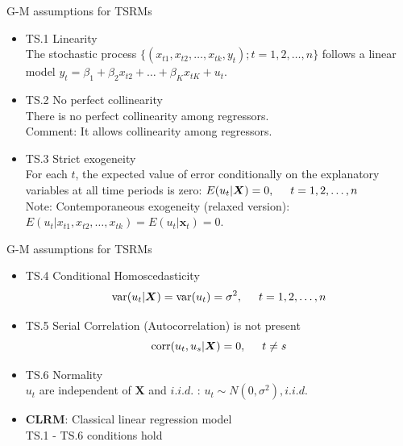 \documentclass{beamer}
\begin{document}
\begin{frame}{G-M assumptions for TSRMs}
\begin{itemize}
\item TS.1 Linearity \\ 
The stochastic process $\{(x_{t1},x_{t2},\dots,x_{tk},y_t);t=1,2,\dots, n \}$ 
follows a linear model $ y_t = \beta_1 + \beta_2 x_{t2} + \dots + \beta_K x_{tK}+u_t$.
\medskip
\item TS.2 No perfect collinearity \\
There is no perfect collinearity among regressors. \\
{\footnotesize Comment: It allows collinearity among regressors.}
\medskip
\item TS.3 Strict exogeneity \\ 
For each $t$, the expected value of error conditionally on the explanatory variables at all time periods is zero: $ E(u_t|\boldsymbol{X})=0, \hspace{0.5cm} t = 1,2,\dots,n$ \\ \medskip
    {\footnotesize Note: Contemporaneous exogeneity (relaxed version): $E(u_t|x_{t1},x_{t2},\dots,x_{tk})=E(u_t|\boldsymbol{x}_t)=0$.}  
\end{itemize}
\end{frame}
\begin{frame}{G-M assumptions for TSRMs}
\begin{itemize}
 \item TS.4 Conditional Homoscedasticity 
 $$\textnormal{var}(u_t|\boldsymbol{X})=\textnormal{var}(u_t)=\sigma^2, \hspace{0.5cm} t=1,2,\dots,n$$
 \medskip
 \item TS.5 Serial Correlation (Autocorrelation) is not present $$ \textnormal{corr}(u_t,u_s|\boldsymbol{X}) = 0, \hspace{0.5cm} t\neq s$$
 \medskip
 \item TS.6 Normality \\
 $u_t$ are independent of $\boldsymbol{X}$ and $\textit{i.i.d.}$ :  $u_t \sim N(0,\sigma^2), \textit{i.i.d.} $
  \vspace{0.6cm}
  \item \textbf{CLRM}: Classical linear regression model \\
 TS.1 - TS.6 conditions hold
\end{itemize}
\end{frame}
\end{document}
